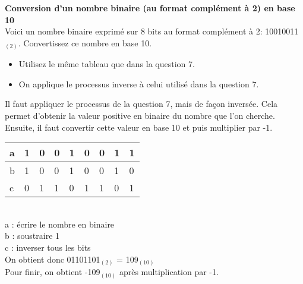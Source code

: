 \begin{Exercice}[15 minutes] \textbf{Conversion d'un nombre binaire (au format complément à 2) en base 10}\\
    
    Voici un nombre binaire exprimé sur 8 bits au format complément à 2: 10010011$_{(2)}$. Convertissez ce nombre en base 10. \\
	
    \begin{conseil}
    
    \begin{itemize}
    	\item Utilisez le même tableau que dans la question 7.
    	\item On applique le processus inverse à celui utilisé dans la question 7. 
    \end{itemize}
    
    \end{conseil}
    
    \begin{solution}
       Il faut appliquer le processus de la question 7, mais de façon inversée. Cela permet d'obtenir la valeur positive en binaire du nombre que l'on cherche. Ensuite, il faut convertir cette valeur en base 10 et puis multiplier par -1. \\
       
       \begin{tabular}{| p{1cm} | p{1cm} | p{1cm} | p{1cm} | p{1cm} | p{1cm} | p{1cm} | p{1cm} | p{1cm} |} 
            \hline
            a & 1 & 0 & 0 & 1 & 0 & 0 & 1 & 1 \\ [0.5ex] 
            \hline
            b & 1 & 0 & 0 & 1 & 0 & 0 & 1 & 0 \\ [0.5ex]
            \hline
            c & 0 & 1 & 1 & 0 & 1 & 1 & 0 & 1 \\ [0.5ex]
            \hline
        \end{tabular} \\
        
        a : écrire le nombre en binaire \\
        
        b : soustraire 1 \\
        
        c : inverser tous les bits \\
        
        On obtient donc 01101101$_{(2)}$ = 109$_{(10)}$ \\
        
        Pour finir, on obtient -109$_{(10)}$ après multiplication par -1.
       
    \end{solution}
\end{Exercice}

